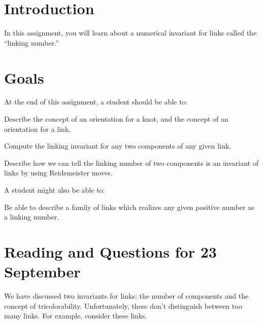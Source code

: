 \documentclass[12pt,letterpaper]{article}
\theoremstyle{definition}
\begin{document}
\setlength{\parskip}{1ex plus 0.5ex minus 0.2ex}
\setlength{\parindent}{0pt}

\pagestyle{fancy}
\cfoot{}

\section*{Introduction}
In this assignment, you will learn about a numerical invariant for links called the ``linking number.''

\section*{Goals}
At the end of this assignment, a student should be able to:
\begin{compactitem}
\item Describe the concept of an orientation for a knot, and the concept of an orientation for a link.
\item Compute the linking invariant for any two components of any given link.
\item Describe how we can tell the linking number of two components is an invariant of links by using Reidemeister moves.
\end{compactitem}
A student might also be able to:
\begin{compactitem}
\item Be able to describe a family of links which realizes any given positive number as a linking number.
\end{compactitem}

\section*{Reading and Questions for 23 September}

We have discussed two invariants for links: the number of components and the concept of tricolorability. 
Unfortunately, these don't distinguish between too many links. For example, consider these links.
\end{document}
